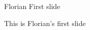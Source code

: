 \begin{frame}{Florian First slide}
\begin{block}{}
  This is Florian's first slide
\end{block}
\end{frame}